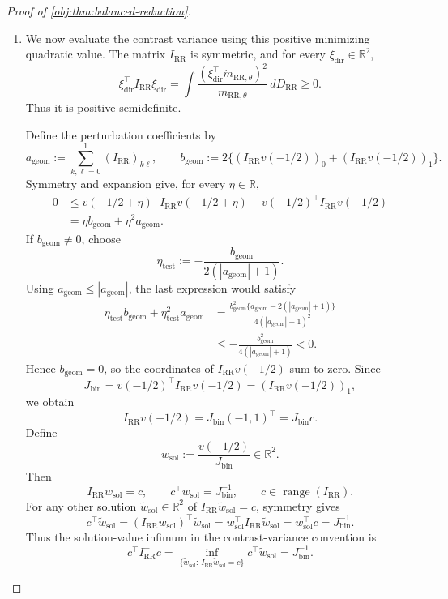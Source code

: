 \documentclass[11pt]{article}
\begin{document}
\begin{proof}[Proof of \cref{obj:thm:balanced-reduction}]
\begin{enumerate}
\item We now evaluate the contrast variance using this positive
minimizing quadratic value. The matrix \(I_{\mathrm{RR}}\) is symmetric,
and for every \(\xi_{\mathrm{dir}}\in\mathbb R^2\),
\[
\xi_{\mathrm{dir}}^\top I_{\mathrm{RR}}\xi_{\mathrm{dir}}
=
\int
\frac{(\xi_{\mathrm{dir}}^\top\dot m_{\mathrm{RR},\theta})^2}
{m_{\mathrm{RR},\theta}}\,dD_{\mathrm{RR}}
\ge0.
\]
Thus it is positive semidefinite.

Define the perturbation coefficients by
\[
a_{\mathrm{geom}}
:=\sum_{k,\ell=0}^1(I_{\mathrm{RR}})_{k\ell},
\qquad
b_{\mathrm{geom}}
:=2\{(I_{\mathrm{RR}}v(-1/2))_0
+(I_{\mathrm{RR}}v(-1/2))_1\}.
\]
Symmetry and expansion give, for every \(\eta\in\mathbb R\),
\[
\begin{aligned}
0
&\le
v(-1/2+\eta)^\top I_{\mathrm{RR}}v(-1/2+\eta)
-v(-1/2)^\top I_{\mathrm{RR}}v(-1/2)\\
&=\eta b_{\mathrm{geom}}+\eta^2a_{\mathrm{geom}}.
\end{aligned}
\]
If \(b_{\mathrm{geom}}\ne0\), choose
\[
\eta_{\mathrm{test}}
:=-\frac{b_{\mathrm{geom}}}{2(|a_{\mathrm{geom}}|+1)}.
\]
Using \(a_{\mathrm{geom}}\le|a_{\mathrm{geom}}|\), the last expression
would satisfy
\[
\begin{aligned}
\eta_{\mathrm{test}}b_{\mathrm{geom}}
+\eta_{\mathrm{test}}^2a_{\mathrm{geom}}
&=
\frac{b_{\mathrm{geom}}^2
\{a_{\mathrm{geom}}-2(|a_{\mathrm{geom}}|+1)\}}
{4(|a_{\mathrm{geom}}|+1)^2}\\
&\le-\frac{b_{\mathrm{geom}}^2}
{4(|a_{\mathrm{geom}}|+1)}<0.
\end{aligned}
\]
Hence \(b_{\mathrm{geom}}=0\), so the coordinates of
\(I_{\mathrm{RR}}v(-1/2)\) sum to zero. Since
\[
J_{\mathrm{bin}}
=v(-1/2)^\top I_{\mathrm{RR}}v(-1/2)
=(I_{\mathrm{RR}}v(-1/2))_1,
\]
we obtain
\[
I_{\mathrm{RR}}v(-1/2)
=J_{\mathrm{bin}}(-1,1)^\top
=J_{\mathrm{bin}}c.
\]
Define
\[
w_{\mathrm{sol}}
:=\frac{v(-1/2)}{J_{\mathrm{bin}}}\in\mathbb R^2.
\]
Then
\[
I_{\mathrm{RR}}w_{\mathrm{sol}}=c,
\qquad
c^\top w_{\mathrm{sol}}=J_{\mathrm{bin}}^{-1},
\qquad
c\in\operatorname{range}(I_{\mathrm{RR}}).
\]
For any other solution
\(\widetilde w_{\mathrm{sol}}\in\mathbb R^2\) of
\(I_{\mathrm{RR}}\widetilde w_{\mathrm{sol}}=c\), symmetry gives
\[
c^\top\widetilde w_{\mathrm{sol}}
=(I_{\mathrm{RR}}w_{\mathrm{sol}})^\top
\widetilde w_{\mathrm{sol}}
=w_{\mathrm{sol}}^\top
I_{\mathrm{RR}}\widetilde w_{\mathrm{sol}}
=w_{\mathrm{sol}}^\top c
=J_{\mathrm{bin}}^{-1}.
\]
Thus the solution-value infimum in the contrast-variance convention is
\[
c^\top I_{\mathrm{RR}}^+c
=
\inf_{\{\widetilde w_{\mathrm{sol}}:\,
I_{\mathrm{RR}}\widetilde w_{\mathrm{sol}}=c\}}
c^\top\widetilde w_{\mathrm{sol}}
=J_{\mathrm{bin}}^{-1}.
\]


\end{enumerate}
\end{proof}
\end{document}
